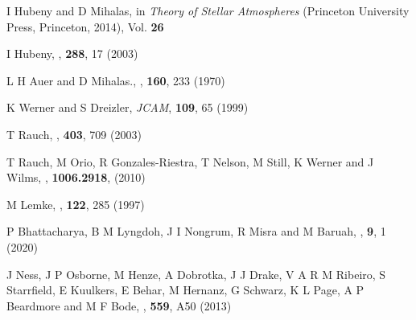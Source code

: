 \begin{thebibliography}{100}
	I  Hubeny and D Mihalas, in \textit{Theory of Stellar Atmospheres} (Princeton University Press, Princeton, 2014), Vol. \textbf{26}
	
	I Hubeny, \textit{\SAM}, \textbf{288}, 17 (2003)
	
	L H Auer and D Mihalas., \textit{\ApJ}, \textbf{160}, 233 (1970)
	
	K Werner and S Dreizler, \textit{JCAM}, \textbf{109}, 65 (1999)
	
	T Rauch, \textit{\AnA}, \textbf{403}, 709 (2003)
	
	T Rauch, M Orio, R Gonzales-Riestra, T Nelson, M Still, K Werner and J Wilms, \textit{\ARX}, \textbf{1006.2918}, (2010)
	
	M Lemke, \textit{\AnASS}, \textbf{122}, 285 (1997)
	
	P Bhattacharya, B M Lyngdoh, J I Nongrum, R Misra and M Baruah, \textit{\AJET}, \textbf{9}, 1 (2020)
	
	J Ness, J P Osborne, M Henze, A Dobrotka, J J Drake, V A R M Ribeiro, S Starrfield, E Kuulkers, E Behar, M Hernanz, G Schwarz, K L Page, A P Beardmore and M F Bode, \textit{\AnA}, \textbf{559}, A50 (2013)
\end{thebibliography}





